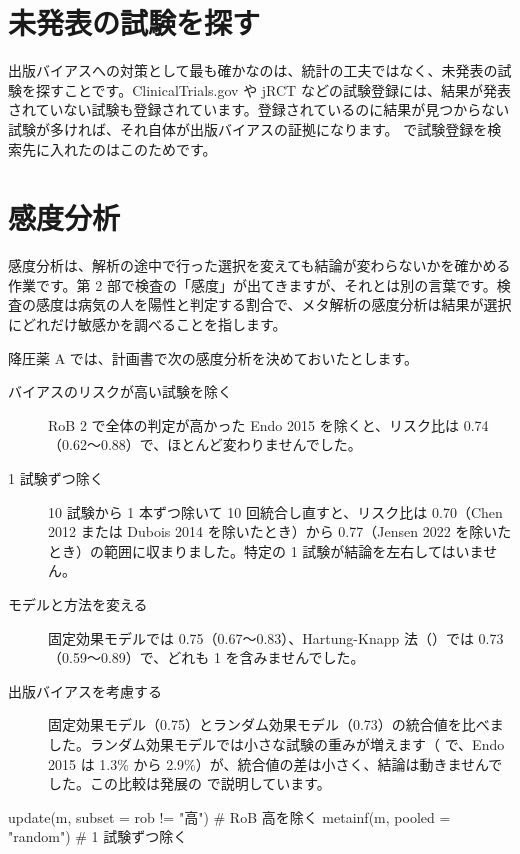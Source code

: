 \section{未発表の試験を探す}
\label{sec:07-5}

出版バイアスへの対策として最も確かなのは、統計の工夫ではなく、未発表の試験を探すことです。ClinicalTrials.gov や jRCT などの試験登録には、結果が発表されていない試験も登録されています。登録されているのに結果が見つからない試験が多ければ、それ自体が出版バイアスの証拠になります。 で試験登録を検索先に入れたのはこのためです。

\section{感度分析}
\label{sec:07-6}

感度分析は、解析の途中で行った選択を変えても結論が変わらないかを確かめる作業です。第 2 部で検査の「感度」が出てきますが、それとは別の言葉です。検査の感度は病気の人を陽性と判定する割合で、メタ解析の感度分析は結果が選択にどれだけ敏感かを調べることを指します。

降圧薬 A では、計画書で次の感度分析を決めておいたとします。

\begin{description}
\item[バイアスのリスクが高い試験を除く] RoB 2 で全体の判定が高かった Endo 2015 を除くと、リスク比は 0.74（0.62〜0.88）で、ほとんど変わりませんでした。
\item[1 試験ずつ除く] 10 試験から 1 本ずつ除いて 10 回統合し直すと、リスク比は 0.70（Chen 2012 または Dubois 2014 を除いたとき）から 0.77（Jensen 2022 を除いたとき）の範囲に収まりました。特定の 1 試験が結論を左右してはいません。
\item[モデルと方法を変える] 固定効果モデルでは 0.75（0.67〜0.83）、Hartung-Knapp 法（）では 0.73（0.59〜0.89）で、どれも 1 を含みませんでした。
\item[出版バイアスを考慮する] 固定効果モデル（0.75）とランダム効果モデル（0.73）の統合値を比べました。ランダム効果モデルでは小さな試験の重みが増えます（ で、Endo 2015 は 1.3\% から 2.9\%）が、統合値の差は小さく、結論は動きませんでした。この比較は発展の  で説明しています。
\end{description}

\begin{rcode}
update(m, subset = rob != "高")   # RoB 高を除く
metainf(m, pooled = "random")    # 1 試験ずつ除く
\end{rcode}


